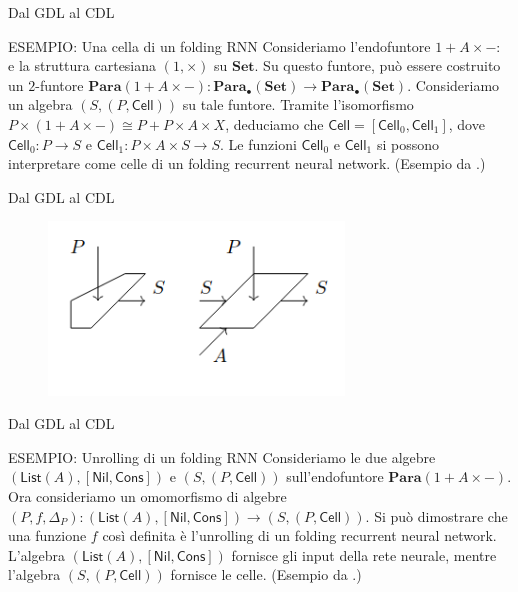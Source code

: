 \documentclass{beamer}
\begin{document}
\begin{frame}{Dal GDL al CDL}
    \begin{block}{ESEMPIO: Una cella di un folding RNN}
        Consideriamo l'endofuntore $1 + A \times -:$ e la struttura cartesiana $(1, \times)$ su $\mathbf{Set}$. Su questo funtore, può essere costruito un $2$-funtore $\mathbf{Para}(1 + A \times -): \mathbf{Para}_{\bullet}(\mathbf{Set}) \to \mathbf{Para}_{\bullet}(\mathbf{Set})$. Consideriamo un algebra $(S,(P,\mathsf{Cell}))$ su tale funtore. Tramite l'isomorfismo $P \times (1 + A \times -) \cong P + P \times A \times X$, deduciamo che $\mathsf{Cell} = [\mathsf{Cell}_0, \mathsf{Cell}_1]$, dove $\mathsf{Cell}_0: P \to S$ e  $\mathsf{Cell}_1: P \times A \times S \to S$. Le funzioni $\mathsf{Cell}_0$ e $\mathsf{Cell}_1$ si possono interpretare come celle di un folding recurrent neural network. (Esempio da \cite{gavranovicposition}.)
    \end{block}
\end{frame}

\begin{frame}{Dal GDL al CDL}
    \begin{figure}
        \begin{center}
            \includegraphics[width=0.7\textwidth]{figures/folding_rnn_cell.png}
            \caption*{\cite{gavranovicposition}}
        \end{center}
    \end{figure}
\end{frame}

\begin{frame}{Dal GDL al CDL}
    \begin{block}{ESEMPIO: Unrolling di un folding RNN}
        Consideriamo le due algebre $(\mathsf{List}(A), [\mathsf{Nil}, \mathsf{Cons}])$ e $(S,(P,\mathsf{Cell}))$ sull'endofuntore $\mathbf{Para}(1 + A \times -)$.
        Ora consideriamo un omomorfismo di algebre $(P,f,\Delta_P): (\mathsf{List}(A), [\mathsf{Nil}, \mathsf{Cons}]) \to (S,(P,\mathsf{Cell}))$. Si può dimostrare che una funzione $f$ così definita è l'unrolling di un folding recurrent neural network. L'algebra $(\mathsf{List}(A), [\mathsf{Nil}, \mathsf{Cons}])$ fornisce gli input della rete neurale, mentre l'algebra $(S,(P,\mathsf{Cell}))$ fornisce le celle. (Esempio da \cite{gavranovicposition}.)
    \end{block}
\end{frame}
\end{document}
